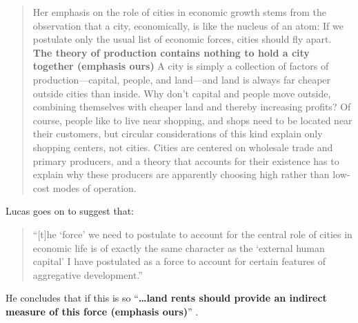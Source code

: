 {\begin{quotation}
    \noindent Her emphasis on the role of cities in economic growth stems from the observation that a city, economically, is like the nucleus of an atom: If we postulate only the usual list of economic forces, cities should fly apart. \textbf{The theory of production contains nothing to hold a city together (emphasis ours)} A city is simply a collection of factors of production---capital, people, and land---and land is always far cheaper outside cities than inside. Why don't capital and people move outside, combining themselves with cheaper land and thereby increasing profits? Of course, people like to live near shopping, and shops need to be located near their customers, but circular considerations of this kind explain only shopping centers, not cities. Cities are centered on wholesale trade and primary producers, and a theory that accounts for their existence has to explain why these producers are apparently choosing high rather than low-cost modes of operation. \cite{lucasMechanicsEconomicDevelopment1988}
\end{quotation}


Lucas goes on to suggest that: 
\begin{quotation} 
    \noindent ``[t]he `force' we need to postulate to account for the central role of cities in economic life is of exactly the same character as the `external human capital' I have postulated as a force to account for certain features of aggregative development.''
\end{quotation} 

\noindent He concludes that if this is so ``\textbf{\dots land rents should provide an indirect measure of this force (emphasis  ours)}'' %
\cite{lucasMechanicsEconomicDevelopment1988}.  



}
